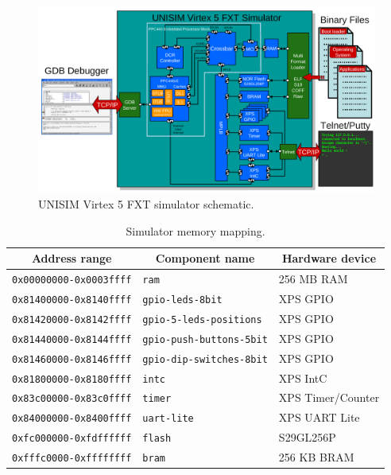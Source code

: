 \begin{figure}[p]
	\begin{center}
		\includegraphics[width=\textwidth]{virtex5fxt/fig_schematic.pdf}
	\end{center}
	\caption{UNISIM Virtex 5 FXT simulator schematic.}
	\label{fig:simulator_schematic}
\end{figure}

\begin{table}[p]
	\begin{center}
		\begin{tabular}{|l|l|l|}
		\hline
		\multicolumn{1}{|c|}{\textbf{Address range}} & \multicolumn{1}{|c|}{\textbf{Component name}} & \multicolumn{1}{|c|}{\textbf{Hardware device}}\\
		\hline
		\texttt{0x00000000-0x0003ffff} & \texttt{ram} & 256 MB RAM\\
		\hline
		\texttt{0x81400000-0x8140ffff} & \texttt{gpio-leds-8bit} & XPS GPIO\\
		\hline
		\texttt{0x81420000-0x8142ffff} & \texttt{gpio-5-leds-positions} & XPS GPIO\\
		\hline
		\texttt{0x81440000-0x8144ffff} & \texttt{gpio-push-buttons-5bit} & XPS GPIO\\
		\hline
		\texttt{0x81460000-0x8146ffff} & \texttt{gpio-dip-switches-8bit} & XPS GPIO\\
		\hline
		\texttt{0x81800000-0x8180ffff} & \texttt{intc} & XPS IntC\\
		\hline
		\texttt{0x83c00000-0x83c0ffff} & \texttt{timer} & XPS Timer/Counter\\
		\hline
		\texttt{0x84000000-0x8400ffff} & \texttt{uart-lite} & XPS UART Lite\\
		\hline
		\texttt{0xfc000000-0xfdffffff} & \texttt{flash} & S29GL256P\\
		\hline
		\texttt{0xfffc0000-0xffffffff} & \texttt{bram} & 256 KB BRAM\\
		\hline
		\end{tabular}
	\end{center}
	\caption{Simulator memory mapping.}
	\label{table:memory_mapping}
\end{table}

